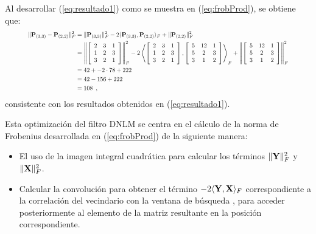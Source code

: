 Al desarrollar (\ref{eq:resultado1}) como se muestra en (\ref{eq:frobProd}), se obtiene que: 
%
\begin{equation}\label{eq:matFrodProd}
\resizebox{.9 \textwidth}{!} 
{
$\begin{split}
\lVert \mat{P}_{\left(3,3\right)}-\mat{P}_{\left(2,2\right)}\rVert_{F} ^{2} & =\lVert \mat{P}_{\left(3,3\right)}\rVert_{F}^2 -2\langle\mat{P}_{\left(3,3\right)},\mat{P}_{\left(2,2\right)}\rangle_{F} + \lVert \mat{P}_{\left(2,2\right)}\rVert_{F}^2  \\
& = \left\Vert\left[\begin{array}{ccc}
2 & 3 & 1\\
1 & 2 & 3\\
3 & 2 & 1
\end{array}\right]\right\Vert_{F}^2-2\left\langle\left[\begin{array}{ccc}
2 & 3 & 1\\
1 & 2 & 3\\
3 & 2 & 1
\end{array}\right],\left[\begin{array}{ccc}
5 & 12 & 1\\
5 & 2 & 3\\
3 & 1 & 2
\end{array}\right]\right\rangle_{F}
+\left\Vert\left[\begin{array}{ccc}
5 & 12 & 1\\
5 & 2 & 3\\
3 & 1 & 2
\end{array}\right]\right\Vert_{F}^2 \\
& =42+-2\cdot78+222\\
& =42-156+222\\
& =108 \enspace ,
\end{split}$
}
\end{equation}
%
consistente con los resultados obtenidos en (\ref{eq:resultado1}).

Esta optimización del filtro DNLM se centra en el cálculo de la norma de Frobenius desarrollada en  (\ref{eq:frobProd}) de la siguiente manera:

\begin{itemize}
\item El uso de la imagen integral cuadrática para calcular los términos $\Vert \mathbf{Y} \Vert_{F}^2 $ y $\Vert \mathbf{X} \Vert_{F}^2 $.
\item Calcular la convolución para obtener el término $-2\langle\mathbf{Y},\mathbf{X}\rangle_{F} $
correspondiente a la correlación del vecindario  con la ventana de búsqueda \mat{\Omega}, para acceder posteriormente al elemento de la matriz resultante en la posici\'on correspondiente.
\end{itemize}

